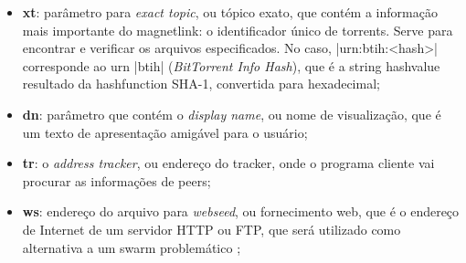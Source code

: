 \begin{itemize}
    \item \textbf{xt}: parâmetro para \emph{exact topic}, ou tópico exato, que contém a
        informação mais importante do \gls*{magnetlink}: o identificador único de
        \glspl*{torrent}. Serve para encontrar e verificar os arquivos especificados.
        No caso, \bverb|urn:btih:<hash>| corresponde ao \gls{urn} \sverb|btih|
        (\emph{BitTorrent Info Hash}), que é a \gls*{string} \gls{hashvalue} resultado
        da \gls{hashfunction} SHA-1, convertida para hexadecimal;

    \item \textbf{dn}: parâmetro que contém o \emph{display name}, ou nome de
        visualização, que é um texto de apresentação amigável para o usuário;

    \item \textbf{tr}: o \emph{address tracker}, ou endereço do \gls*{tracker}, onde o
        programa cliente vai procurar as informações de \glspl*{peer};

    \item \textbf{ws}: endereço do arquivo para \emph{webseed}, ou fornecimento web,
        que é o endereço de Internet de um servidor HTTP ou FTP, que será utilizado como
        alternativa a um \gls*{swarm} problemático \cite{wiki:torrent};
\end{itemize}
